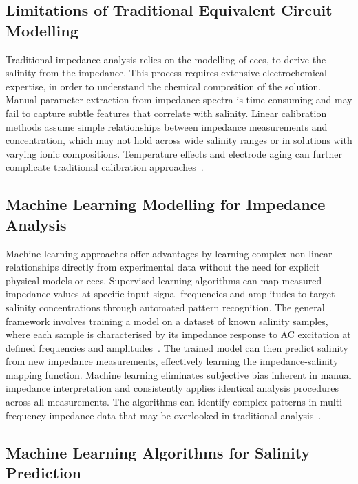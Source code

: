 \subsection{Limitations of Traditional Equivalent Circuit Modelling}
Traditional impedance analysis relies on the modelling of \glspl{eec}, to derive the salinity from the impedance.
This process requires extensive electrochemical expertise, in order to understand the chemical composition of the solution.
Manual parameter extraction from impedance spectra is time consuming and may fail to capture subtle features that correlate with salinity.
Linear calibration methods assume simple relationships between impedance measurements and concentration, which may not hold across wide salinity ranges or in solutions with varying ionic compositions.
Temperature effects and electrode aging can further complicate traditional calibration approaches~\cite{barsoukov_impedance_2005}.

\subsection{Machine Learning Modelling for Impedance Analysis}
Machine learning approaches offer advantages by learning complex non-linear relationships directly from experimental data without the need for explicit physical models or \glspl{eec}.
Supervised learning algorithms can map measured impedance values at specific input signal frequencies and amplitudes to target salinity concentrations through automated pattern recognition.
The general framework involves training a model on a dataset of known salinity samples, where each sample is characterised by its impedance response to AC excitation at defined frequencies and amplitudes~\cite{bongiorno_exploring_2022}. 
The trained model can then predict salinity from new impedance measurements, effectively learning the impedance-salinity mapping function.
Machine learning eliminates subjective bias inherent in manual impedance interpretation and consistently applies identical analysis procedures across all measurements.
The algorithms can identify complex patterns in multi-frequency impedance data that may be overlooked in traditional analysis~\cite{xu_electrochemical_2020}.

\subsection{Machine Learning Algorithms for Salinity Prediction}
